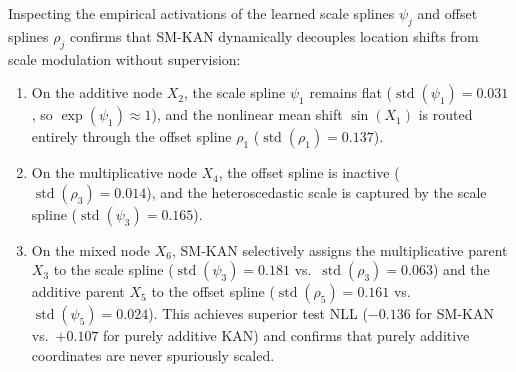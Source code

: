 \documentclass[11pt,a4paper]{article}
\theoremstyle{plain}
\theoremstyle{definition}
\theoremstyle{remark}
\begin{document}
Inspecting the empirical activations of the learned scale splines $\psi_j$ and offset splines $\rho_j$ confirms that SM-KAN dynamically decouples location shifts from scale modulation without supervision:
\begin{enumerate}
    \item On the additive node $X_2$, the scale spline $\psi_1$ remains flat ($\operatorname{std}(\psi_1) = 0.031$, so $\exp(\psi_1) \approx 1$), and the nonlinear mean shift $\sin(X_1)$ is routed entirely through the offset spline $\rho_1$ ($\operatorname{std}(\rho_1) = 0.137$).
    \item On the multiplicative node $X_4$, the offset spline is inactive ($\operatorname{std}(\rho_3) = 0.014$), and the heteroscedastic scale is captured by the scale spline ($\operatorname{std}(\psi_3) = 0.165$).
    \item On the mixed node $X_6$, SM-KAN selectively assigns the multiplicative parent $X_3$ to the scale spline ($\operatorname{std}(\psi_3) = 0.181$ vs.\ $\operatorname{std}(\rho_3) = 0.063$) and the additive parent $X_5$ to the offset spline ($\operatorname{std}(\rho_5) = 0.161$ vs.\ $\operatorname{std}(\psi_5) = 0.024$). This achieves superior test NLL ($-0.136$ for SM-KAN vs.\ $+0.107$ for purely additive KAN) and confirms that purely additive coordinates are never spuriously scaled.
\end{enumerate}
\end{document}
